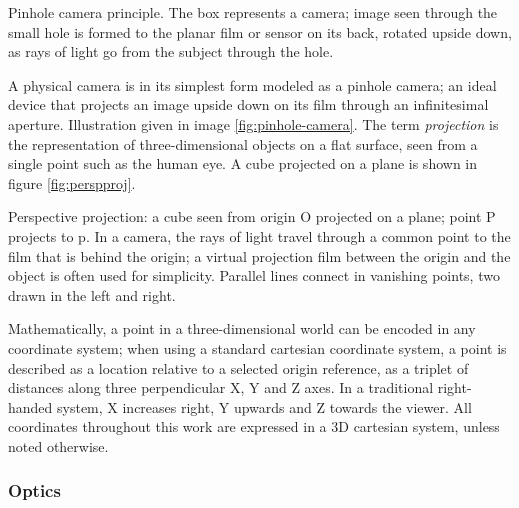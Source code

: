 

{Pinhole camera principle. The box represents a camera; image seen through the small hole is formed to the planar film or sensor on its back, rotated upside down, as rays of light go from the subject through the hole.}

A physical camera is in its simplest form modeled as a pinhole camera; an ideal device that projects an image upside down on its film through an infinitesimal aperture.
Illustration given in image \ref{fig:pinhole-camera}.
The term \emph{projection} is the representation of three-dimensional objects on a flat surface, seen from a single point such as the human eye.
A cube projected on a plane is shown in figure \ref{fig:perspproj}.

{Perspective projection: a cube seen from origin O projected on a plane; point P projects to p. In a camera, the rays of light travel through a common point to the film that is behind the origin; a virtual projection film between the origin and the object is often used for simplicity. Parallel lines connect in vanishing points, two drawn in the left and right.}



Mathematically, a point in a three-dimensional world can be encoded in any coordinate system;
when using a standard cartesian coordinate system, a point is described as a location relative to a selected origin reference, as a triplet of distances along three perpendicular X, Y and Z axes. %
In a traditional right-handed system, X increases right, Y upwards and Z towards the viewer.
All coordinates throughout this work are expressed in a 3D cartesian system, unless noted otherwise.



\subsubsection{Optics} %

